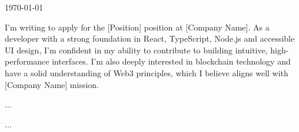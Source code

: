\documentclass[12pt, a4paper]{awesome-cv}
\begin{document}
\makecvheader[R]

\makecvfooter
  {\today}
  {}
  {}

\makelettertitle

\begin{cvletter}

I'm writing to apply for the [Position] position at [Company Name].
As a developer with a strong foundation in React, TypeScript, Node.js and accessible UI design,
I'm confident in my ability to contribute to building intuitive, high-performance interfaces.
I'm also deeply interested in blockchain technology and have a solid understanding of Web3 principles,
which I believe aligns well with [Company Name] mission.

...

...

\end{cvletter}

\makeletterclosing
\end{document}
